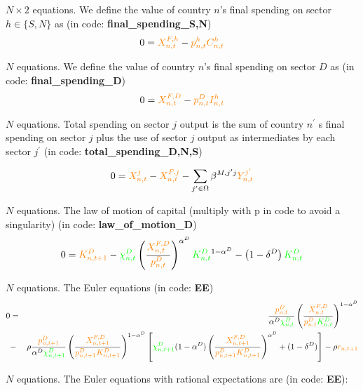 \documentclass[12pt, bibtotoc, tablecaptionabove, figurecaptionabove, fleqn]{article}
\newcommand{\cl}[1]{{\color{orange}{#1}}}
\newcommand{\st}[1]{{\color{green}{#1}}}
\begin{document}
\noindent $N \times 2$ equations. We define the value of country $n$'s final spending on sector $h \in \{S,N\}$ as (in code: {\bf{final\_spending\_S,N}}) 
\begin{equation}
0 = \cl{ X^{F,h}_{n,t}} - \cl{p^h_{n,t}} \cl{C^h_{n,t}}
\end{equation}

\noindent $N$ equations. We define the value of country $n$'s final spending on sector $D$ as  
(in code: {\bf{final\_spending\_D}}) 
\begin{equation}
0 = \cl{ X^{F,D}_{n,t}} - \cl{p^D_{n,t}} \cl{I^h_{n,t}}
\end{equation}

\noindent $N$ equations. Total spending on sector $j$ output is the sum of country $n^{\prime}$ s final spending on sector $j$
plus the use of sector $j$ output as intermediates by each sector $j^{\prime}$ (in code: {\bf{total\_spending\_D,N,S}}) 

\begin{equation}
0 = \cl{X_{n, t}^{j}} - \cl{X_{n, t}^{F, j}} - \sum_{j^{\prime} \in \Omega} \beta^{M, j^{\prime} j} \cl{Y_{n, t}^{j^{\prime}}}
\end{equation}

\noindent $N$ equations. The law of motion of capital (multiply with p in code to avoid a singularity) (in code: {\bf{law\_of\_motion\_D}}) 
\begin{equation}
0 = \cl{K^D_{n,t+1}} - \st{\chi^D_{n,t}} \left( \frac{\cl{X_{n,t}^{F,D}}}{\cl{p_{n,t}^D}} \right)^{\alpha^D} \st{K^D_{n,t}}^{1-\alpha^D} - \left(1 - \delta^D\right) \st{K^D_{n,t}}
\end{equation}

\noindent $N$ equations. The Euler equations (in code: {\bf{EE}})
\begin{eqnarray}
0 &=& \frac{\cl{p_{n, t}^{D}}}{\alpha^D \st{\chi^D_{n, t}}}\left(\frac{\cl{X_{n, t}^{F,D}}}{\cl{p_{n, t}^{D}} \st{K^D_{n, t}}}\right)^{1-\alpha^D} \\
&-& \rho \frac{\cl{p_{n, t+1}^{D}}}{\alpha^D \st{\chi^D_{n, t+1}}}\left(\frac{\cl{X_{n, t+1}^{F,D}}}{\cl{p_{n, t+1}^{D}} \cl{K^D_{n, t+1}}}\right)^{1-\alpha^D}\left[\st{\chi^D_{n, t+1}}(1-\alpha^D)\left(\frac{\cl{X_{n, t+1}^{F,D}}}{\cl{p_{n, t+1}^{D}} \cl{K^D_{n, t+1}}}\right)^{\alpha^D}+(1-\delta^D)\right]-\rho \cl{r_{n, t+1}}\nonumber
\end{eqnarray}

\noindent $N$ equations. The Euler equations with rational expectations are (in code: {\bf{EE}}):
\end{document}
